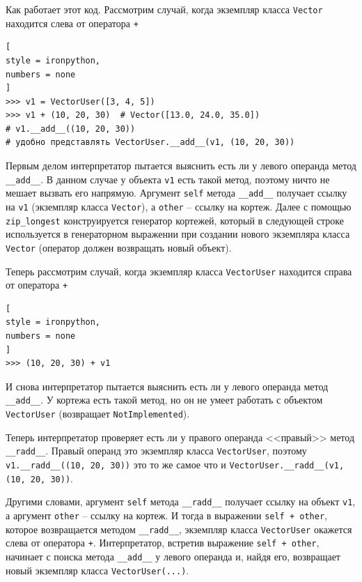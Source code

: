 \documentclass[%
	11pt,
	a4paper,
	utf8,
		]{article}
\begin{document}
Как работает этот код. Рассмотрим случай, когда экземпляр класса \texttt{Vector} находится слева от оператора \texttt{+}

\begin{lstlisting}[
style = ironpython,
numbers = none
]
>>> v1 = VectorUser([3, 4, 5])
>>> v1 + (10, 20, 30)  # Vector([13.0, 24.0, 35.0])
# v1.__add__((10, 20, 30))
# удобно представлять VectorUser.__add__(v1, (10, 20, 30))
\end{lstlisting}

Первым делом интерпретатор пытается выяснить есть ли у левого операнда метод \texttt{\_\_add\_\_}. В данном случае у объекта \texttt{v1} есть такой метод, поэтому ничто не мешает вызвать его напрямую. Аргумент \texttt{self} метода \texttt{\_\_add\_\_} получает ссылку на \texttt{v1} (экземпляр класса \texttt{Vector}), а \texttt{other} -- ссылку на кортеж. Далее с помощью \texttt{zip\_longest} конструируется генератор кортежей, который в следующей строке используется в генераторном выражении при создании нового экземпляра класса \texttt{Vector} (оператор должен возвращать новый объект).

Теперь рассмотрим случай, когда экземпляр класса \texttt{VectorUser} находится справа от оператора \texttt{+}

\begin{lstlisting}[
style = ironpython,
numbers = none
]
>>> (10, 20, 30) + v1
\end{lstlisting}

И снова интерпретатор пытается выяснить есть ли у левого операнда метод \texttt{\_\_add\_\_}. У кортежа есть такой метод, но он не умеет работать с объектом \texttt{VectorUser} (возвращает \texttt{NotImplemented}).

Теперь интерпретатор проверяет есть ли у правого операнда <<правый>> метод \texttt{\_\_radd\_\_}. Правый операнд это экземпляр класса \texttt{VectorUser}, поэтому \texttt{v1.\_\_radd\_\_((10, 20, 30))} это то же самое что и \texttt{VectorUser.\_\_radd\_\_(v1, (10, 20, 30))}.

Другими словами, аргумент \texttt{self} метода \texttt{\_\_radd\_\_} получает ссылку на объект \texttt{v1}, а аргумент \texttt{other} -- ссылку на кортеж. И тогда в выражении \texttt{self + other}, которое возвращается методом \texttt{\_\_radd\_\_}, экземпляр класса \texttt{VectorUser} окажется слева от оператора \texttt{+}. Интерпретатор, встретив выражение \texttt{self + other}, начинает с поиска метода \texttt{\_\_add\_\_} у левого операнда и, найдя его, возвращает новый экземпляр класса \texttt{VectorUser(...)}.
\end{document}
